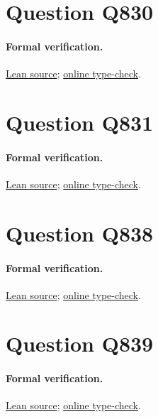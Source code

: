 \documentclass[11pt]{article}
\begin{document}
\section{Question Q830}

\paragraph{Formal verification.}
\href{https://github.com/l-pommeret/rms-math-proofs/blob/c146d294686494b8153667a0cbfe54be1a98fe00/lean/RMS/Q830.lean}{Lean source}; \href{https://github.com/l-pommeret/rms-math-proofs/actions/runs/31289098996}{online type-check}.

\section{Question Q831}

\paragraph{Formal verification.}
\href{https://github.com/l-pommeret/rms-math-proofs/blob/12deed818539ae97bedd7a58261fe225b1f8fded/lean/RMS/Q831.lean}{Lean source}; \href{https://github.com/l-pommeret/rms-math-proofs/actions/runs/31287989509}{online type-check}.

\section{Question Q838}

\paragraph{Formal verification.}
\href{https://github.com/l-pommeret/rms-math-proofs/blob/20c73bc0c82040146b665d2b8763730771e66471/lean/RMS/Q838Exact.lean}{Lean source}; \href{https://github.com/l-pommeret/rms-math-proofs/actions/runs/31313543931}{online type-check}.

\section{Question Q839}

\paragraph{Formal verification.}
\href{https://github.com/l-pommeret/rms-math-proofs/blob/0bdeb7f1c3bd8a11a07d47de898b27e4fb3a4165/lean/RMS/Q839Completion.lean}{Lean source}; \href{https://github.com/l-pommeret/rms-math-proofs/actions/runs/31313919021}{online type-check}.
\end{document}
